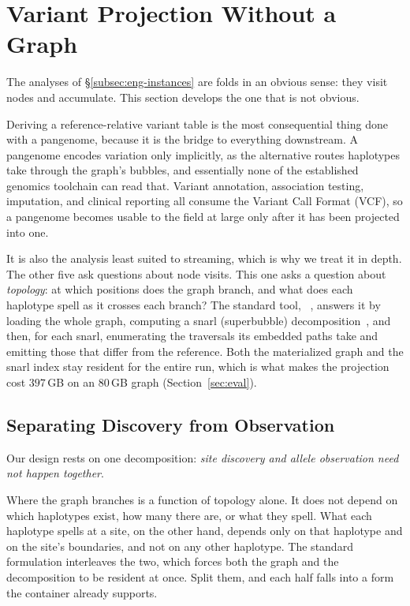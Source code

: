 \section{Variant Projection Without a Graph}
\label{sec:deconstruct}

The analyses of \S\ref{subsec:eng-instances} are folds in an obvious sense: they
visit nodes and accumulate. This section develops the one that is not obvious.

Deriving a reference-relative variant table is the most consequential thing done
with a pangenome, because it is the bridge to everything downstream. A pangenome
encodes variation only implicitly, as the alternative routes haplotypes take
through the graph's bubbles, and essentially none of the established genomics
toolchain can read that. Variant annotation, association testing, imputation, and
clinical reporting all consume the Variant Call Format (VCF), so a pangenome
becomes usable to the field at large only after it has been projected into one.

It is also the analysis least suited to streaming, which is why we treat it in
depth. The other five ask questions about node visits. This one asks a question
about \emph{topology}: at which positions does the graph branch, and what does
each haplotype spell as it crosses each branch? The standard tool,
~\cite{garrison2018variation}, answers it by loading the whole
graph, computing a snarl (superbubble)
decomposition~\cite{onodera2013superbubbles,paten2018superbubbles}, and then, for
each snarl, enumerating the traversals its embedded paths take and emitting those
that differ from the reference. Both the materialized graph and the snarl index
stay resident for the entire run, which is what makes the projection cost
$397$\,GB on an $80$\,GB graph (Section~\ref{sec:eval}).

\subsection{Separating Discovery from Observation}
\label{subsec:dec-idea}

Our design rests on one decomposition: \emph{site discovery and allele observation
need not happen together}.

Where the graph branches is a function of topology alone. It does not depend on
which haplotypes exist, how many there are, or what they spell. What each
haplotype spells at a site, on the other hand, depends only on that haplotype and
on the site's boundaries, and not on any other haplotype. The standard formulation
interleaves the two, which forces both the graph and the decomposition to be
resident at once. Split them, and each half falls into a form the container
already supports.

